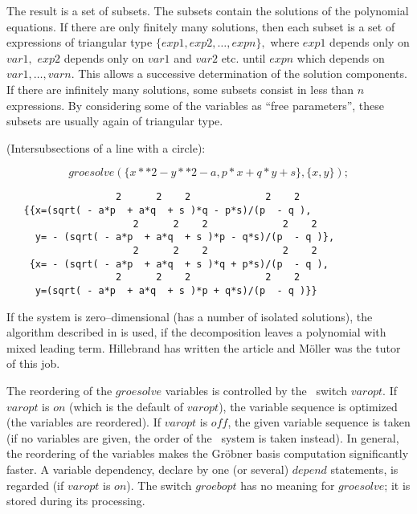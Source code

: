 The result is a set of subsets. The subsets contain the solutions of the
polynomial equations. If there are only finitely many solutions,
then each subset is a set of expressions of triangular type
$\{exp1, exp2,\ldots , expn\},$ where $exp1$ depends only on
$var1,$ $exp2$ depends only on $var1$ and $var2$ etc. until $expn$ which
depends on $var1,\ldots,varn.$ This allows a successive determination of
the solution components. If there are infinitely many solutions,
some subsets consist in less than $n$ expressions. By considering some
of the variables as ``free parameters'',  these subsets are usually
again of triangular type.

\example (Intersubsections of a line with a circle):

\[ groesolve(\{x**2 - y**2 - a, p*x+q*y+s\},\{x,y\}); \]

\begin{verbatim}
                   2      2    2             2    2
   {{x=(sqrt( - a*p  + a*q  + s )*q - p*s)/(p  - q ),
                      2      2    2             2    2
     y= - (sqrt( - a*p  + a*q  + s )*p - q*s)/(p  - q )},
                      2      2    2             2    2
    {x= - (sqrt( - a*p  + a*q  + s )*q + p*s)/(p  - q ),
                   2      2    2             2    2
     y=(sqrt( - a*p  + a*q  + s )*p + q*s)/(p  - q )}}
\end{verbatim}

If the system is zero--dimensional (has a number of isolated solutions),
the algorithm described in \cite{Hillebrand:99} is used, if the decomposition
leaves a polynomial with mixed leading term. Hillebrand has written the
article and M\"oller was the tutor of this job.

The reordering of the $groesolve$ variables is controlled by the
\REDUCE \ switch $varopt$. If $varopt$ is $on$ (which is the default
of $varopt$), the variable sequence is optimized (the variables are reordered).
If $varopt$ is $off$, the given variable sequence is taken (if no variables
are given, the order of the \REDUCE \ system is taken instead). In general, the
reordering of the variables makes the Gr\"obner basis computation
significantly faster.
A variable dependency, declare by one (or several) $depend$ statements,
is regarded (if $varopt$ is $on$). The switch $groebopt$ has no meaning
for $groesolve$; it is stored during its processing.


